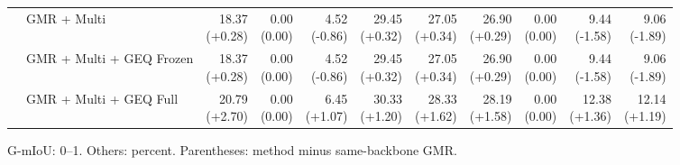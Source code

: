 \documentclass{article}
\begin{document}
{\begin{tabular}{llrrrrrrrrr}
 & GMR + Multi & \shortstack{18.37 \\ {\scriptsize\textcolor{Gain}{(+0.28)}}} & \shortstack{0.00 \\ {\scriptsize\textcolor{Zero}{(0.00)}}} & \shortstack{4.52 \\ {\scriptsize\textcolor{Loss}{(-0.86)}}} & \shortstack{29.45 \\ {\scriptsize\textcolor{Gain}{(+0.32)}}} & \shortstack{27.05 \\ {\scriptsize\textcolor{Gain}{(+0.34)}}} & \shortstack{26.90 \\ {\scriptsize\textcolor{Gain}{(+0.29)}}} & \shortstack{0.00 \\ {\scriptsize\textcolor{Zero}{(0.00)}}} & \shortstack{9.44 \\ {\scriptsize\textcolor{Loss}{(-1.58)}}} & \shortstack{9.06 \\ {\scriptsize\textcolor{Loss}{(-1.89)}}} \\
 & GMR + Multi + GEQ Frozen & \shortstack{18.37 \\ {\scriptsize\textcolor{Gain}{(+0.28)}}} & \shortstack{0.00 \\ {\scriptsize\textcolor{Zero}{(0.00)}}} & \shortstack{4.52 \\ {\scriptsize\textcolor{Loss}{(-0.86)}}} & \shortstack{29.45 \\ {\scriptsize\textcolor{Gain}{(+0.32)}}} & \shortstack{27.05 \\ {\scriptsize\textcolor{Gain}{(+0.34)}}} & \shortstack{26.90 \\ {\scriptsize\textcolor{Gain}{(+0.29)}}} & \shortstack{0.00 \\ {\scriptsize\textcolor{Zero}{(0.00)}}} & \shortstack{9.44 \\ {\scriptsize\textcolor{Loss}{(-1.58)}}} & \shortstack{9.06 \\ {\scriptsize\textcolor{Loss}{(-1.89)}}} \\
 & GMR + Multi + GEQ Full & \shortstack{20.79 \\ {\scriptsize\textcolor{Gain}{(+2.70)}}} & \shortstack{0.00 \\ {\scriptsize\textcolor{Zero}{(0.00)}}} & \shortstack{6.45 \\ {\scriptsize\textcolor{Gain}{(+1.07)}}} & \shortstack{30.33 \\ {\scriptsize\textcolor{Gain}{(+1.20)}}} & \shortstack{28.33 \\ {\scriptsize\textcolor{Gain}{(+1.62)}}} & \shortstack{28.19 \\ {\scriptsize\textcolor{Gain}{(+1.58)}}} & \shortstack{0.00 \\ {\scriptsize\textcolor{Zero}{(0.00)}}} & \shortstack{12.38 \\ {\scriptsize\textcolor{Gain}{(+1.36)}}} & \shortstack{12.14 \\ {\scriptsize\textcolor{Gain}{(+1.19)}}} \\
\bottomrule\end{tabular}}\par
G-mIoU: 0--1. Others: percent. Parentheses: method minus same-backbone GMR.\par
\end{document}
